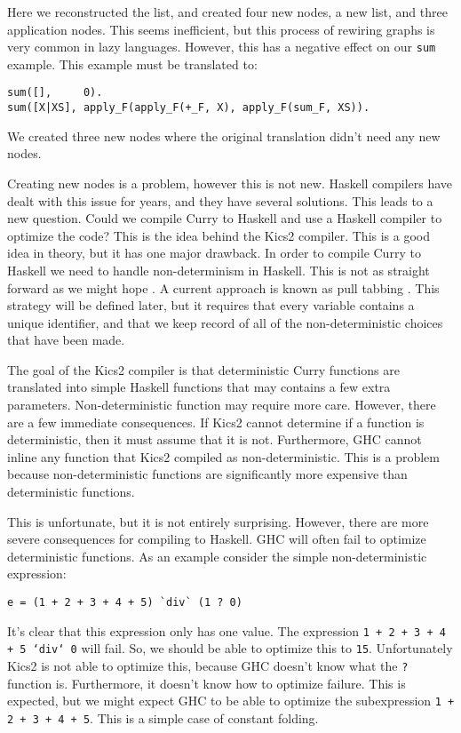 Here we reconstructed the list, and created four new nodes, a new list, and three application nodes.
This seems inefficient, but this process of rewiring graphs is very common in lazy languages.
However, this has a negative effect on our \texttt{sum} example.
This example must be translated to:
\begin{verbatim}
sum([],     0).
sum([X|XS], apply_F(apply_F(+_F, X), apply_F(sum_F, XS)).
\end{verbatim}
We created three new nodes where the original translation didn't need any new nodes.

Creating new nodes is a problem, however this is not new.
Haskell compilers have dealt with this issue for years, and they have several solutions.
This leads to a new question.
Could we compile Curry to Haskell and use a Haskell compiler to optimize the code?
This is the idea behind the Kics2 compiler.
This is a good idea in theory, but it has one major drawback.
In order to compile Curry to Haskell we need to handle non-determinism in Haskell.
This is not as straight forward as we might hope \cite{failure-list, curry-monad}.
A current approach is known as pull tabbing \cite{Antoy11ICLP}.
This strategy will be defined later, but it requires that every variable contains a unique identifier,
and that we keep record of all of the non-deterministic choices that have been made.

The goal of the Kics2 compiler is that deterministic Curry functions are translated into simple Haskell functions
that may contains a few extra parameters.
Non-deterministic function may require more care.
However, there are a few immediate consequences.
If Kics2 cannot determine if a function is deterministic, then it must assume that it is not.
Furthermore, GHC cannot inline any function that Kics2 compiled as non-deterministic.
This is a problem because non-deterministic functions are significantly more expensive than deterministic functions.

This is unfortunate, but it is not entirely surprising.
However, there are more severe consequences for compiling to Haskell.
GHC will often fail to optimize deterministic functions.
As an example consider the simple non-deterministic expression:
\begin{verbatim}
e = (1 + 2 + 3 + 4 + 5) `div` (1 ? 0)
\end{verbatim}
It's clear that this expression only has one value.
The expression \texttt{1 + 2 + 3 + 4 + 5 `div` 0} will fail.
So, we should be able to optimize this to \texttt{15}.
Unfortunately Kics2 is not able to optimize this,
because GHC doesn't know what the \texttt ? function is.
Furthermore, it doesn't know how to optimize failure.
This is expected, but we might expect GHC to be able to
optimize the subexpression \texttt{1 + 2 + 3 + 4 + 5}.
This is a simple case of constant folding.

